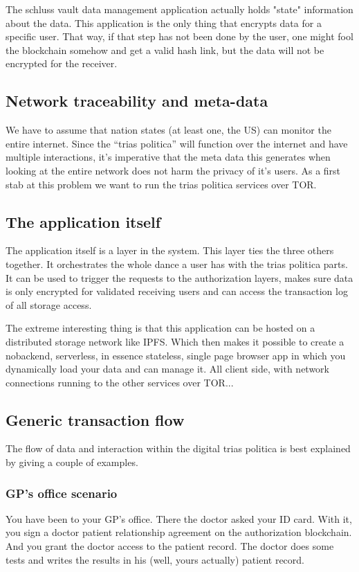 \documentclass{article}
\begin{document}
The schluss vault data management application actually holds "state" information about the data. This application is the only thing that encrypts data for a specific user. That way, if that step has not been done by the user, one might fool the blockchain somehow and get a valid hash link, but the data will not be encrypted for the receiver.


\subsection{Network traceability and meta-data }
We have to assume that nation states (at least one, the US) can monitor the entire internet. Since the ``trias politica'' will function over the internet and have multiple interactions, it's imperative that the meta data this generates when looking at the entire network does not harm the privacy of it's users. As a first stab at this problem we want to run the trias politica services over TOR.

\subsection{The application itself}
The application itself is a layer in the system. This layer ties the three others together. It orchestrates the whole dance a user has with the trias politica parts. It can be used to trigger the requests to the authorization layers, makes sure data is only encrypted for validated receiving users and can access the transaction log of all storage access.

The extreme interesting thing is that this application can be hosted on a distributed storage network like IPFS. Which then makes it possible to create a nobackend, serverless, in essence stateless, single page browser app in which you dynamically load your data and can manage it. All client side, with network connections running to the other services over TOR...


\subsection{Generic transaction flow}
The flow of data and interaction within the digital trias politica is best explained by giving a couple of examples.

\subsubsection{GP's office scenario}
You have been to your GP's office. There the doctor asked your ID card. With it, you sign a doctor patient relationship agreement on the authorization blockchain. And you grant the doctor access to the patient record. The doctor does some tests and writes the results in his (well, yours actually) patient record.
\end{document}
